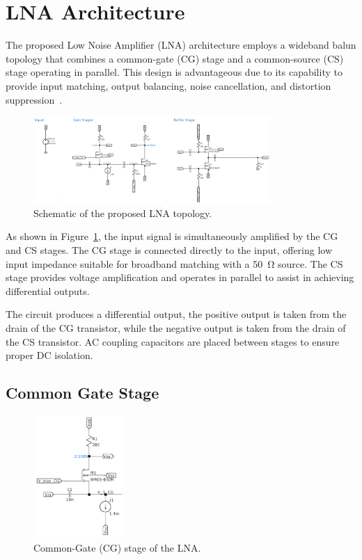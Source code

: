 \section{LNA Architecture}

The proposed Low Noise Amplifier (LNA) architecture employs a wideband balun topology that combines a common-gate (CG) stage and a common-source (CS) stage operating in parallel. This design is advantageous due to its capability to provide input matching, output balancing, noise cancellation, and distortion suppression~\cite{Blaakmeer2008}.

\begin{figure}[H]
    \centering
    \includegraphics[width=0.8\textwidth]{Images/schem-LNA.png}
    \caption{Schematic of the proposed LNA topology.}
    \label{fig:schem-lna}
\end{figure}

As shown in Figure~\ref{fig:schem-lna}, the input signal is simultaneously amplified by the CG and CS stages. The CG stage is connected directly to the input, offering low input impedance suitable for broadband matching with a 50~\si{\ohm} source. The CS stage provides voltage amplification and operates in parallel to assist in achieving differential outputs.

The circuit produces a differential output, the positive output is taken from the drain of the CG transistor, while the negative output is taken from the drain of the CS transistor. AC coupling capacitors are placed between stages to ensure proper DC isolation.

\subsection{Common Gate Stage}

\begin{figure}[H]
    \centering
    \includegraphics[width=0.3\textwidth]{Images/schem-CG.png}
    \caption{Common-Gate (CG) stage of the LNA.}
    \label{fig:schem-cg}
\end{figure}

